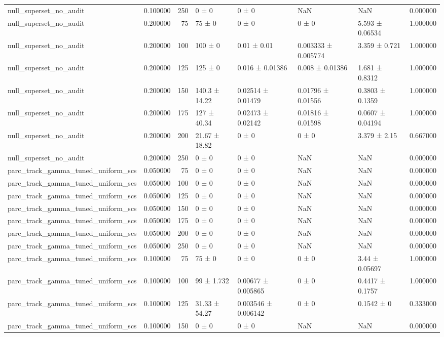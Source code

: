\begin{tabular}{lrrllllr}
null_superset_no_audit & 0.100000 & 250 & 0 ± 0 & 0 ± 0 & NaN & NaN & 0.000000 \\
null_superset_no_audit & 0.200000 & 75 & 75 ± 0 & 0 ± 0 & 0 ± 0 & 5.593 ± 0.06534 & 1.000000 \\
null_superset_no_audit & 0.200000 & 100 & 100 ± 0 & 0.01 ± 0.01 & 0.003333 ± 0.005774 & 3.359 ± 0.721 & 1.000000 \\
null_superset_no_audit & 0.200000 & 125 & 125 ± 0 & 0.016 ± 0.01386 & 0.008 ± 0.01386 & 1.681 ± 0.8312 & 1.000000 \\
null_superset_no_audit & 0.200000 & 150 & 140.3 ± 14.22 & 0.02514 ± 0.01479 & 0.01796 ± 0.01556 & 0.3803 ± 0.1359 & 1.000000 \\
null_superset_no_audit & 0.200000 & 175 & 127 ± 40.34 & 0.02473 ± 0.02142 & 0.01816 ± 0.01598 & 0.0607 ± 0.04194 & 1.000000 \\
null_superset_no_audit & 0.200000 & 200 & 21.67 ± 18.82 & 0 ± 0 & 0 ± 0 & 3.379 ± 2.15 & 0.667000 \\
null_superset_no_audit & 0.200000 & 250 & 0 ± 0 & 0 ± 0 & NaN & NaN & 0.000000 \\
parc_track_gamma_tuned_uniform_scs & 0.050000 & 75 & 0 ± 0 & 0 ± 0 & NaN & NaN & 0.000000 \\
parc_track_gamma_tuned_uniform_scs & 0.050000 & 100 & 0 ± 0 & 0 ± 0 & NaN & NaN & 0.000000 \\
parc_track_gamma_tuned_uniform_scs & 0.050000 & 125 & 0 ± 0 & 0 ± 0 & NaN & NaN & 0.000000 \\
parc_track_gamma_tuned_uniform_scs & 0.050000 & 150 & 0 ± 0 & 0 ± 0 & NaN & NaN & 0.000000 \\
parc_track_gamma_tuned_uniform_scs & 0.050000 & 175 & 0 ± 0 & 0 ± 0 & NaN & NaN & 0.000000 \\
parc_track_gamma_tuned_uniform_scs & 0.050000 & 200 & 0 ± 0 & 0 ± 0 & NaN & NaN & 0.000000 \\
parc_track_gamma_tuned_uniform_scs & 0.050000 & 250 & 0 ± 0 & 0 ± 0 & NaN & NaN & 0.000000 \\
parc_track_gamma_tuned_uniform_scs & 0.100000 & 75 & 75 ± 0 & 0 ± 0 & 0 ± 0 & 3.44 ± 0.05697 & 1.000000 \\
parc_track_gamma_tuned_uniform_scs & 0.100000 & 100 & 99 ± 1.732 & 0.00677 ± 0.005865 & 0 ± 0 & 0.4417 ± 0.1757 & 1.000000 \\
parc_track_gamma_tuned_uniform_scs & 0.100000 & 125 & 31.33 ± 54.27 & 0.003546 ± 0.006142 & 0 ± 0 & 0.1542 ± 0 & 0.333000 \\
parc_track_gamma_tuned_uniform_scs & 0.100000 & 150 & 0 ± 0 & 0 ± 0 & NaN & NaN & 0.000000 \\

\end{tabular}
